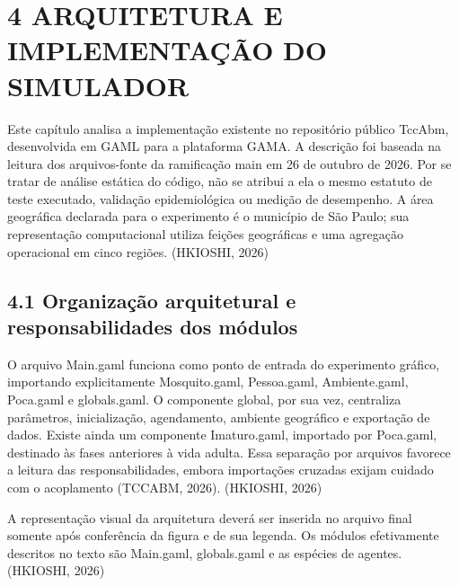 \section{4 ARQUITETURA E IMPLEMENTAÇÃO DO
SIMULADOR}\label{arquitetura-e-implementauxe7uxe3o-do-simulador}

Este capítulo analisa a implementação existente no repositório público
TccAbm, desenvolvida em GAML para a plataforma GAMA. A descrição foi
baseada na leitura dos arquivos-fonte da ramificação main em 26 de
outubro de 2026. Por se tratar de análise estática do código, não se
atribui a ela o mesmo estatuto de teste executado, validação
epidemiológica ou medição de desempenho. A área geográfica declarada
para o experimento é o município de São Paulo; sua representação
computacional utiliza feições geográficas e uma agregação operacional em
cinco regiões. (HKIOSHI, 2026)

\subsection{4.1 Organização arquitetural e responsabilidades dos
módulos}\label{organizauxe7uxe3o-arquitetural-e-responsabilidades-dos-muxf3dulos}

O arquivo Main.gaml funciona como ponto de entrada do experimento
gráfico, importando explicitamente Mosquito.gaml, Pessoa.gaml,
Ambiente.gaml, Poca.gaml e globals.gaml. O componente global, por sua
vez, centraliza parâmetros, inicialização, agendamento, ambiente
geográfico e exportação de dados. Existe ainda um componente
Imaturo.gaml, importado por Poca.gaml, destinado às fases anteriores à
vida adulta. Essa separação por arquivos favorece a leitura das
responsabilidades, embora importações cruzadas exijam cuidado com o
acoplamento (TCCABM, 2026). (HKIOSHI, 2026)

A representação visual da arquitetura deverá ser inserida no arquivo
final somente após conferência da figura e de sua legenda. Os módulos
efetivamente descritos no texto são Main.gaml, globals.gaml e as
espécies de agentes. (HKIOSHI, 2026)

